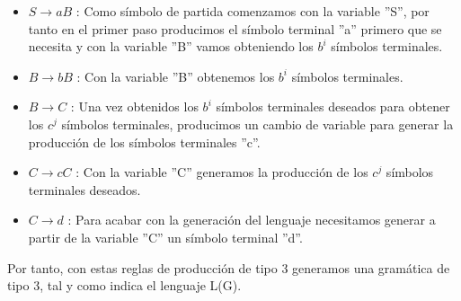 \begin{itemize}
	\item $S \rightarrow aB$ : Como símbolo de partida comenzamos con la variable ''S'', por tanto en el primer paso producimos el símbolo terminal ''a'' primero que se necesita y con la variable ''B'' vamos obteniendo los $b^{i}$ símbolos terminales.
	\item $B \rightarrow bB$ : Con la variable ''B'' obtenemos los $b^{i}$ símbolos terminales.
	\item $B \rightarrow C$ : Una vez obtenidos los $b^{i}$ símbolos terminales deseados para obtener los $c^{j}$ símbolos terminales, producimos un cambio de variable para generar la producción de los símbolos terminales ''c''. 
	\item $C \rightarrow cC$ : Con la variable ''C'' generamos la producción de los $c^{j}$ símbolos terminales deseados.
	\item $C \rightarrow d$ : Para acabar con la generación del lenguaje necesitamos generar a partir de la variable ''C'' un símbolo terminal ''d''.
\end{itemize}
Por tanto, con estas reglas de producción de tipo 3 generamos una gramática de tipo 3, tal y como indica el lenguaje L(G).




